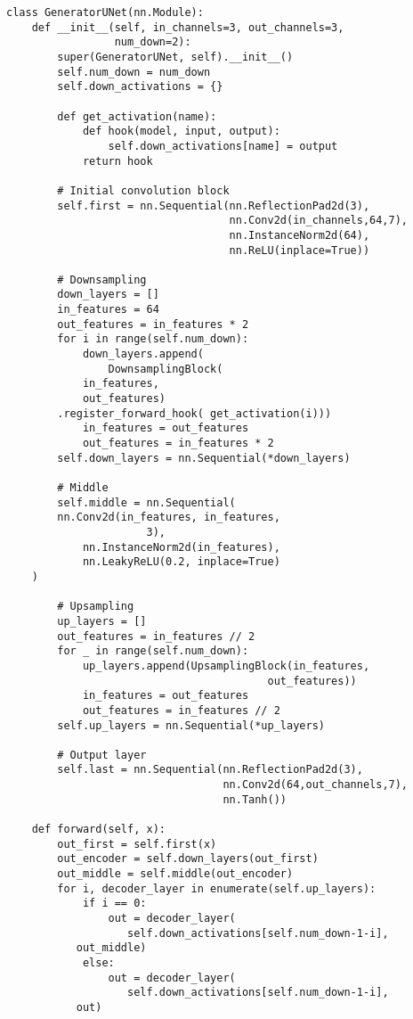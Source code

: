 \documentclass[../main.tex]{subfiles}
\begin{document}
\begin{lstlisting}
class GeneratorUNet(nn.Module):
    def __init__(self, in_channels=3, out_channels=3,
                 num_down=2):
        super(GeneratorUNet, self).__init__()
        self.num_down = num_down
        self.down_activations = {}

        def get_activation(name):
            def hook(model, input, output):
                self.down_activations[name] = output
            return hook

        # Initial convolution block
        self.first = nn.Sequential(nn.ReflectionPad2d(3),
                                   nn.Conv2d(in_channels,64,7),
                                   nn.InstanceNorm2d(64),
                                   nn.ReLU(inplace=True))

        # Downsampling
        down_layers = []
        in_features = 64
        out_features = in_features * 2
        for i in range(self.num_down):
            down_layers.append(
                DownsamplingBlock(
		    in_features,
		    out_features)
		.register_forward_hook( get_activation(i)))
            in_features = out_features
            out_features = in_features * 2
        self.down_layers = nn.Sequential(*down_layers)

        # Middle
        self.middle = nn.Sequential(
	    nn.Conv2d(in_features, in_features,
                      3),
            nn.InstanceNorm2d(in_features),
            nn.LeakyReLU(0.2, inplace=True)
	)

        # Upsampling
        up_layers = []
        out_features = in_features // 2
        for _ in range(self.num_down):
            up_layers.append(UpsamplingBlock(in_features,
	                                     out_features))
            in_features = out_features
            out_features = in_features // 2
        self.up_layers = nn.Sequential(*up_layers)

        # Output layer
        self.last = nn.Sequential(nn.ReflectionPad2d(3),
                                  nn.Conv2d(64,out_channels,7),
                                  nn.Tanh())

    def forward(self, x):
        out_first = self.first(x)
        out_encoder = self.down_layers(out_first)
        out_middle = self.middle(out_encoder)
        for i, decoder_layer in enumerate(self.up_layers):
            if i == 0:
                out = decoder_layer(
                   self.down_activations[self.num_down-1-i],
		   out_middle)
            else:
                out = decoder_layer(
                   self.down_activations[self.num_down-1-i],
		   out)


\end{lstlisting}
\end{document}
